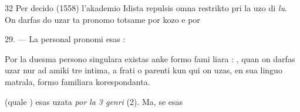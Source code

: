 \begin{VUpage}[36]{32}
{Per decido (1558) l'akademio Idista repulsis omna restrikto pri\nl
la uzo di \textit{lu}. On darfas do uzar ta pronomo totsame por kozo e por
\parplein
}
\VUsaut{5.2mm}
\VUsaut{4.9mm}

29. --- La personal pronomi esas :

\VUblanc{3.54pt}%
\VUblanc{3.61pt}%

Por la duesma persono singulara existas anke formo fami\cc
liara : , quan on darfas uzar nur ad amiki tre intima, a\nl
frati o parenti kun qui on uzas, en sua linguo matrala, formo\nl
familiara korespondanta.

 (quale ) esas uzata \textit{por la 3 genri} (2). Ma, se esas
\parplein
\end{VUpage}

